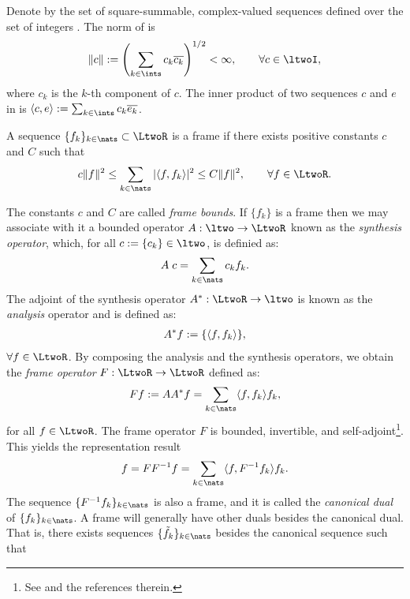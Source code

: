  Denote by \ltwoI the set of square-summable, complex-valued sequences defined over the set of integers \ints. The norm of \ltwoI is 
 \begin{align}
   \Vert c \Vert := \left( \sum_{k \in \ints} c_k \overline{c_k} \right)^{1/2} <   \infty, \qquad \forall c \in \ltwoI,\notag
   \label{}
 \end{align}
 where $c_k$ is the $k$-th component of $c$. The inner product of two sequences $c$ and $e$ in \ltwoI is $\langle c, e \rangle := \sum_{k \in \ints} c_k \overline{e_k}$.
\begin{defn}
   A sequence $\{f_k\}_{k \in \nats} \subset \LtwoR$ is a frame if there exists positive constants $c$ and $C$ such that
  \begin{align}
    c \Vert f \Vert^2 \le \sum_{k \in \nats}\vert \langle f, f_k\rangle \vert^2 \le  C \Vert f \Vert^2,
  \qquad  \forall f \in \LtwoR. \notag \label{}
  \end{align}
\end{defn}
\noindent The  constants $c$ and $C$ are called   \emph{frame bounds}. If $\{f_k\}$ is a frame then we may associate with it a bounded operator $A:\ltwo \to \LtwoR$ known as the  \emph{synthesis operator}, which, for all $c:= \{c_k\} \in \ltwo$, is definied as:  
\begin{align}
  A\;c = \sum_{k \in \nats} c_k f_k.  \notag
\end{align}
The adjoint of the synthesis operator $A^*:\LtwoR \to \ltwo$ is known as the \emph{analysis} operator and    is  defined as:
\begin{align}
A^*f := \{\langle f, f_k \rangle\},  \notag 
\end{align}
$\forall f\in \LtwoR$. By composing the analysis and the synthesis operators, we obtain the \emph{frame operator} $F:\LtwoR \to \LtwoR$ defined as: 
\begin{align}
  F f := AA^*f = \sum_{k \in \nats} \langle f, f_k \rangle f_k, \notag
\end{align}
for all $f \in \LtwoR$.
The frame operator $F$ is bounded, invertible, and self-adjoint\footnote{See \cite{Christensen2001} and the references therein.}. This yields the representation result
\begin{align}
  f = FF^{-1}f = \sumn \langle f, F^{-1} f_k\rangle f_k. \notag 
  \label{}
\end{align}
The sequence $\{F^{-1}f_k\}_{k \in \nats}$ is also a frame, and it is called the \emph{canonical dual} of $\{f_k\}_{k \in \nats}$. A frame will generally have other duals besides the canonical dual. That is, there exists  sequences $\{\tilde{f}_k\}_{k \in \nats}$ besides the canonical sequence such that 
